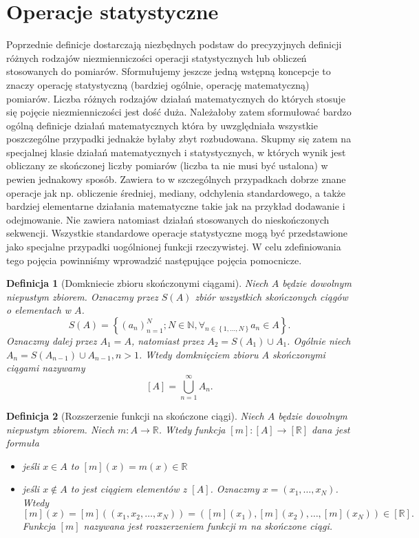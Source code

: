 \documentclass[12pt,a4paper]{report}
\newtheorem{definition}{Definicja}[chapter]
\newcommand{\zbior}[1]{\left\lbrace {#1} \right\rbrace }
\newcommand{\domkniecie}[1]{\left\lbrack{#1}\right\rbrack}
\begin{document}
\section{Operacje statystyczne}
Poprzednie definicje dostarczają niezbędnych podstaw do precyzyjnych definicji różnych rodzajów niezmienniczości operacji statystycznych lub obliczeń stosowanych do pomiarów. Sformułujemy jeszcze jedną wstępną koncepcje to znaczy operację statystyczną  (bardziej ogólnie, operację matematyczną) pomiarów. Liczba różnych rodzajów działań matematycznych  do których stosuje się pojęcie niezmienniczości jest dość duża. Należałoby zatem sformułować bardzo ogólną definicje działań matematycznych która by uwzględniała wszystkie poszczególne przypadki jednakże byłaby zbyt rozbudowana. Skupmy się zatem na specjalnej klasie działań matematycznych i statystycznych, w których wynik jest obliczany ze skończonej liczby pomiarów (liczba ta nie musi być ustalona) w pewien jednakowy sposób. Zawiera to w szczególnych przypadkach dobrze znane operacje jak np. obliczenie średniej, mediany, odchylenia standardowego, a także bardziej elementarne działania matematyczne takie jak na przykład dodawanie i odejmowanie. Nie zawiera natomiast działań stosowanych do nieskończonych sekwencji. Wszystkie standardowe operacje statystyczne mogą być przedstawione jako specjalne przypadki uogólnionej funkcji rzeczywistej. W celu zdefiniowania tego pojęcia powinniśmy wprowadzić następujące pojęcia pomocnicze. 
\begin{definition}[Domkniecie zbioru skończonymi ciągami]
Niech $A$ będzie dowolnym niepustym zbiorem. Oznaczmy przez $S(A)$ zbiór wszystkich skończonych ciągów o elementach w $A$.
$$
S(A)=\zbior{(a_n)^{N}_{n=1}; N\in \mathbb{N}, \forall_{n\in \zbior{1,\dots,N}} a_n \in A}.
$$
Oznaczmy dalej przez $A_1 =A$, natomiast przez $A_2 = S(A_1) \cup A_1$. Ogólnie niech $A_n = S(A_{n-1})\cup A_{n-1}, n>1$. Wtedy domknięciem zbioru $A$ skończonymi ciągami nazywamy
$$
\domkniecie{A}=\bigcup^{\infty}_{n=1} A_n.
$$ 
\end{definition}
\begin{definition}[Rozszerzenie funkcji na skończone ciągi]
Niech $A$ będzie dowolnym niepustym zbiorem. Niech $m:A\to \mathbb{R}$. Wtedy funkcja $\domkniecie{m}:\domkniecie{A}\to \domkniecie{\mathbb{R}}$ dana jest formuła
\begin{itemize}
\item jeśli $x\in A$ to $\domkniecie{m}(x) =m(x) \in \mathbb{R}$
\item jeśli $x\notin A$ to jest ciągiem elementów z $\domkniecie{A}$. Oznaczmy $x=(x_1,\dots,x_N)$. Wtedy 
$$
\domkniecie{m}(x)=\domkniecie{m}((x_1,x_2,\dots,x_N))=(\domkniecie{m}(x_1),\domkniecie{m}(x_2),\dots, \domkniecie{m}(x_N))\in \domkniecie{\mathbb{R}}.
$$
Funkcja $\domkniecie{m}$ nazywana jest rozszerzeniem funkcji $m$ na skończone ciągi.
\end{itemize}
\end{definition}
\end{document}
